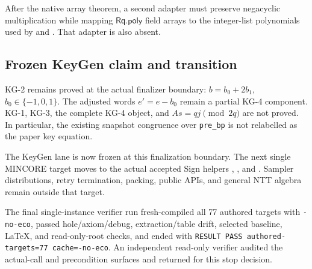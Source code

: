 After the native array theorem, a second adapter must preserve negacyclic
multiplication while mapping \(\mathsf{Rq.poly}\) field arrays to the
integer-list polynomials used by  and
.  That adapter is also absent.

\subsection*{Frozen KeyGen claim and transition}

KG-2 remains proved at the actual finalizer boundary:
\(b=b_0+2b_1\), \(b_0\in\{-1,0,1\}\).  The adjusted words
\(e'=e-b_0\) remain a partial KG-4 component.  KG-1, KG-3, the complete KG-4
object, and \(As=qj\pmod{2q}\) are not proved.  In particular, the existing
snapshot congruence over \texttt{pre\_bp} is not relabelled as the paper key
equation.

The KeyGen lane is now frozen at this finalization boundary.  The next single
MINCORE target moves to the actual accepted Sign helpers
, , and
.  Sampler distributions, retry termination,
packing, public APIs, and general NTT algebra remain outside that target.

The final single-instance verifier run fresh-compiled all 77 authored targets
with \texttt{-no-eco}, passed hole/axiom/debug, extraction/table drift,
selected baseline, LaTeX, and read-only-root checks, and ended with
\texttt{RESULT PASS authored-targets=77 cache=-no-eco}.  An independent
read-only verifier audited the actual-call and precondition surfaces and
returned  for this stop decision.
